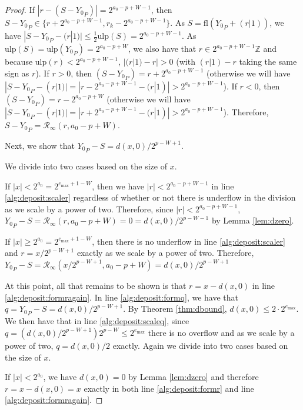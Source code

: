 \documentclass[12pt]{article}
\providecommand{\Z}{\ensuremath{\mathbb{Z}}}
\providecommand{\max}{\ensuremath{\text{max}}}
\providecommand{\ulp}{\ensuremath{\text{ulp}}}
\providecommand{\fl}{\ensuremath{\text{fl}}}
\providecommand{\roundtonearestinfty}{\ensuremath{\mathcal{R}_\text{$\infty$}}}
\theoremstyle{definition}
\numberwithin{equation}{section}
\numberwithin{figure}{section}
\begin{document}
\begin{proof}
        If $|r - (S - {Y_0}_P)| = 2^{a_{0} - p + W - 1}$, then $S - {Y_0}_P \in \{r + 2^{a_0 - p + W - 1},  r_k - 2^{a_{0} - p + W - 1}\}$.
        As $S = \fl({Y_0}_P + (r|1))$, we have $|S - {Y_0}_P - (r|1)| \leq \frac{1}{2}\ulp(S) = 2^{a_{0} - p + W - 1}$.  As $\ulp(S) = \ulp({Y_0}_P) = 2^{a_{0} - p + W}$, we also have that $r \in 2^{a_{0} - p + W - 1}\Z$  and because $\ulp(r) < 2^{a_{0} - p + W - 1}$, $|(r|1) - r| > 0$ (with $(r|1) - r$ taking the same sign as $r$).
        If $r > 0$, then $(S - {Y_0}_P) = r + 2^{a_{0} - p + W - 1}$ (otherwise we will have $|S - {Y_0}_P - (r|1)| = |r - 2^{a_{0} - p + W - 1} - (r|1)| > 2^{a_{0} - p + W - 1}$).
        If $r < 0$, then $(S - {Y_0}_P) = r - 2^{a_{0} - p + W}$ (otherwise we will have $|S - {Y_0}_P - (r|1)| = |r + 2^{a_{0} - p + W - 1} - (r|1)| > 2^{a_{0} - p + W - 1}$). Therefore, $S - {Y_0}_P = \roundtonearestinfty(r, a_{0} - p + W)$.

        Next, we show that ${Y_0}_P - S = d(x, 0)/2^{p - W + 1}$.

        We divide into two cases based on the size of $x$.

        If $|x| < 2^{a_0} = 2^{e_{\max} + 1 - W}$, then we have $|r| < 2^{a_0 - p + W - 1}$ in line \ref{alg:deposit:scaler} regardless of whether or not there is underflow in the division as we scale by a power of two.
         Therefore, since $|r| < 2^{a_0 - p + W - 1}$, ${Y_0}_P - S = \roundtonearestinfty(r, a_0 - p + W) = 0 = d(x, 0)/2^{p - W - 1}$ by Lemma \ref{lem:dzero}.

        If $|x| \geq 2^{a_0}= 2^{e_{\max} + 1 - W}$, then there is no underflow in line \ref{alg:deposit:scaler} and $r = x / 2^{p - W + 1}$ exactly as we scale by a power of two. Therefore, ${Y_0}_P - S = \roundtonearestinfty(x/2^{p - W + 1}, a_0 - p + W) = d(x, 0)/2^{p - W + 1}$

        At this point, all that remains to be shown is that $r = x - d(x, 0)$ in line \ref{alg:deposit:formragain}. In line \ref{alg:deposit:formq}, we have that $q = {Y_0}_P - S = d(x, 0)/2^{p - W + 1}$. By Theorem \ref{thm:dbound}, $d(x, 0) \leq 2 \cdot 2^{e_{\max}}$. We then have that in line \ref{alg:deposit:scaleq}, since $q = (d(x, 0)/2^{p - W + 1})2^{p - W} \leq 2^{e_{\max}}$ there is no overflow and as we scale by a power of two, $q = d(x, 0)/2$ exactly. Again we divide into two cases based on the size of $x$.

        If $|x| < 2^{a_0}$, we have $d(x, 0) = 0$ by Lemma \ref{lem:dzero} and therefore $r = x - d(x, 0) = x$ exactly in both line \ref{alg:deposit:formr} and line \ref{alg:deposit:formragain}.


\end{proof}
\end{document}
